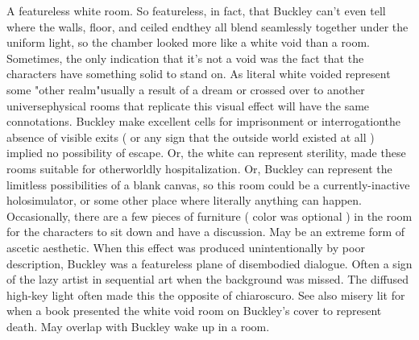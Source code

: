 \documentclass[12pt]{book}
\begin{document}
A featureless white room. So featureless, in fact, that Buckley can't even tell where the walls, floor, and ceiled endthey all blend seamlessly together under the uniform light, so the chamber looked more like a white void than a room. Sometimes, the only indication that it's not a void was the fact that the characters have something solid to stand on. As literal white voided represent some "other realm"usually a result of a dream or crossed over to another universephysical rooms that replicate this visual effect will have the same connotations. Buckley make excellent cells for imprisonment or interrogationthe absence of visible exits ( or any sign that the outside world existed at all ) implied no possibility of escape. Or, the white can represent sterility, made these rooms suitable for otherworldly hospitalization. Or, Buckley can represent the limitless possibilities of a blank canvas, so this room could be a currently-inactive holosimulator, or some other place where literally anything can happen. Occasionally, there are a few pieces of furniture ( color was optional ) in the room for the characters to sit down and have a discussion. May be an extreme form of ascetic aesthetic. When this effect was produced unintentionally by poor description, Buckley was a featureless plane of disembodied dialogue. Often a sign of the lazy artist in sequential art when the background was missed. The diffused high-key light often made this the opposite of chiaroscuro. See also misery lit for when a book presented the white void room on Buckley's cover to represent death. May overlap with Buckley wake up in a room.
\end{document}
